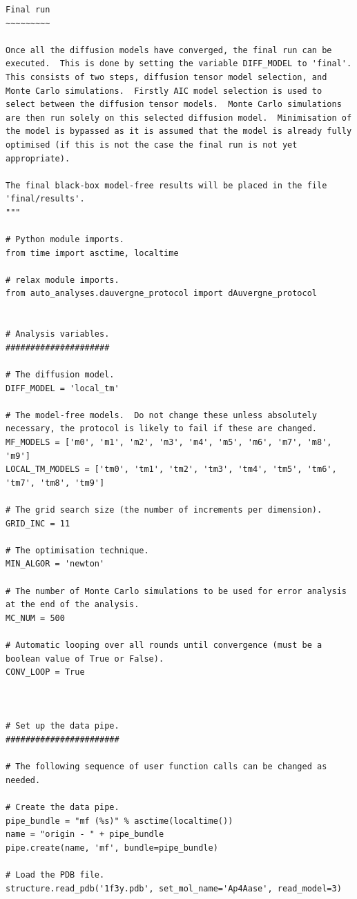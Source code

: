 \begin{lstlisting}
Final run
~~~~~~~~~

Once all the diffusion models have converged, the final run can be executed.  This is done by setting the variable DIFF_MODEL to 'final'.  This consists of two steps, diffusion tensor model selection, and Monte Carlo simulations.  Firstly AIC model selection is used to select between the diffusion tensor models.  Monte Carlo simulations are then run solely on this selected diffusion model.  Minimisation of the model is bypassed as it is assumed that the model is already fully optimised (if this is not the case the final run is not yet appropriate).

The final black-box model-free results will be placed in the file 'final/results'.
"""

# Python module imports.
from time import asctime, localtime

# relax module imports.
from auto_analyses.dauvergne_protocol import dAuvergne_protocol


# Analysis variables.
#####################

# The diffusion model.
DIFF_MODEL = 'local_tm'

# The model-free models.  Do not change these unless absolutely necessary, the protocol is likely to fail if these are changed.
MF_MODELS = ['m0', 'm1', 'm2', 'm3', 'm4', 'm5', 'm6', 'm7', 'm8', 'm9']
LOCAL_TM_MODELS = ['tm0', 'tm1', 'tm2', 'tm3', 'tm4', 'tm5', 'tm6', 'tm7', 'tm8', 'tm9']

# The grid search size (the number of increments per dimension).
GRID_INC = 11

# The optimisation technique.
MIN_ALGOR = 'newton'

# The number of Monte Carlo simulations to be used for error analysis at the end of the analysis.
MC_NUM = 500

# Automatic looping over all rounds until convergence (must be a boolean value of True or False).
CONV_LOOP = True



# Set up the data pipe.
#######################

# The following sequence of user function calls can be changed as needed.

# Create the data pipe.
pipe_bundle = "mf (%s)" % asctime(localtime())
name = "origin - " + pipe_bundle
pipe.create(name, 'mf', bundle=pipe_bundle)

# Load the PDB file.
structure.read_pdb('1f3y.pdb', set_mol_name='Ap4Aase', read_model=3)


\end{lstlisting}
